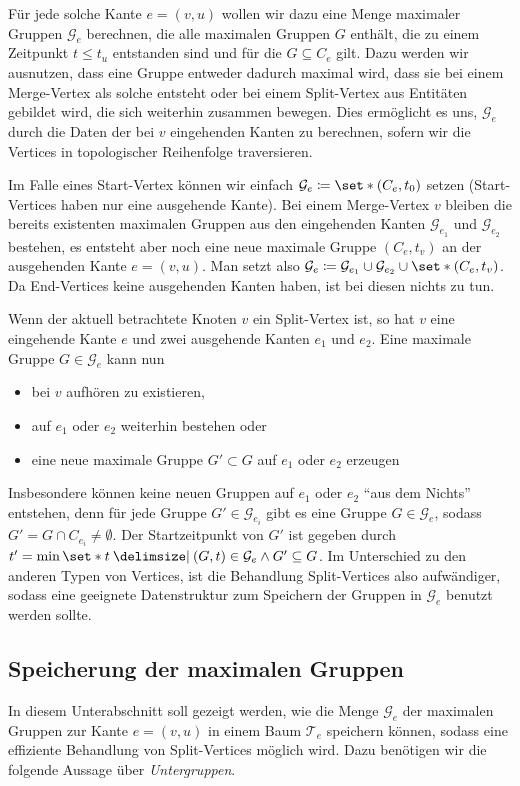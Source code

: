 Für jede solche Kante $e=(v,u)$ wollen wir dazu eine Menge maximaler Gruppen $\mathcal{G}_e$ berechnen, die alle maximalen Gruppen $G$ enthält, die zu einem Zeitpunkt $t \le t_u$ entstanden sind und für die $G \subseteq C_e$ gilt.
Dazu werden wir ausnutzen, dass eine Gruppe entweder dadurch maximal wird, dass sie bei einem Merge-Vertex als solche entsteht oder bei einem Split-Vertex aus Entitäten gebildet wird, die sich weiterhin zusammen bewegen.
Dies ermöglicht es uns, $\mathcal{G}_e$ durch die Daten der bei $v$ eingehenden Kanten zu berechnen, sofern wir die Vertices in topologischer Reihenfolge traversieren.

Im Falle eines Start-Vertex können wir einfach $\mathcal{G}_e \coloneqq \set*{(C_e,t_0)}$ setzen (Start-Vertices haben nur eine ausgehende Kante).
Bei einem Merge-Vertex $v$ bleiben die bereits existenten maximalen Gruppen aus den eingehenden Kanten $\mathcal{G}_{e_1}$ und $\mathcal{G}_{e_2}$ bestehen, es entsteht aber noch eine neue maximale Gruppe $(C_e,t_v)$ an der ausgehenden Kante $e=(v,u)$.
Man setzt also $\mathcal{G}_e \coloneqq \mathcal{G}_{e_1} \cup \mathcal{G}_{e_2} \cup \set*{(C_e,t_v)}$.
Da End-Vertices keine ausgehenden Kanten haben, ist bei diesen nichts zu tun.

Wenn der aktuell betrachtete Knoten $v$ ein Split-Vertex ist, so hat $v$ eine eingehende Kante $e$ und zwei ausgehende Kanten $e_1$ und $e_2$.
Eine maximale Gruppe $G \in \mathcal{G}_e$ kann nun
\begin{itemize}
	\item bei $v$ aufhören zu existieren,
	\item auf $e_1$ oder $e_2$ weiterhin bestehen oder
	\item eine neue maximale Gruppe $G' \subset G$ auf $e_1$ oder $e_2$ erzeugen
\end{itemize}
Insbesondere können keine neuen Gruppen auf $e_1$ oder $e_2$ \enquote{aus dem Nichts} entstehen, denn für jede Gruppe $G' \in \mathcal{G}_{e_i}$ gibt es eine Gruppe $G \in \mathcal{G}_e$, sodass $G' = G \cap C_{e_i} \neq \emptyset$.
Der Startzeitpunkt von $G'$ ist gegeben durch $t' = \min \set*{t \given (G,t) \in \mathcal{G}_e \wedge G' \subseteq G}$.
Im Unterschied zu den anderen Typen von Vertices, ist die Behandlung Split-Vertices also aufwändiger, sodass eine geeignete Datenstruktur zum Speichern der Gruppen in $\mathcal{G}_e$ benutzt werden sollte.

\subsection{Speicherung der maximalen Gruppen} %
\label{sub:speicherung_der_maximalen_gruppen}
In diesem Unterabschnitt soll gezeigt werden, wie die Menge $\mathcal{G}_e$ der maximalen Gruppen zur Kante $e=(v,u)$ in einem Baum $\mathcal{T}_e$ speichern können, sodass eine effiziente Behandlung von Split-Vertices möglich wird.
Dazu benötigen wir die folgende Aussage über \emph{Untergruppen}.

